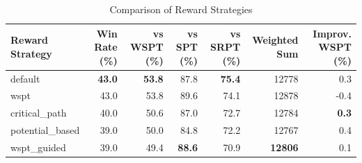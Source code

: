 \begin{table}[htbp]%
\centering%
\begin{tabular}{lrrrrrr}%
\toprule%
\textbf{Reward Strategy}&\textbf{Win Rate (\%)}&\textbf{vs WSPT (\%)}&\textbf{vs SPT (\%)}&\textbf{vs SRPT (\%)}&\textbf{Weighted Sum}&\textbf{Improv. WSPT (\%)}\\%
\midrule%
default&\textbf{43.0}&\textbf{53.8}&87.8&\textbf{75.4}&12778&0.3\\%
wspt&43.0&53.8&89.6&74.1&12878&-0.4\\%
critical_path&40.0&50.6&87.0&72.7&12784&\textbf{0.3}\\%
potential_based&39.0&50.0&84.8&72.2&12767&0.4\\%
wspt_guided&39.0&49.4&\textbf{88.6}&70.9&\textbf{12806}&0.1\\%
\bottomrule%
\end{tabular}%
\caption{Comparison of Reward Strategies}%
\label{tab:rewards}%
\end{table}